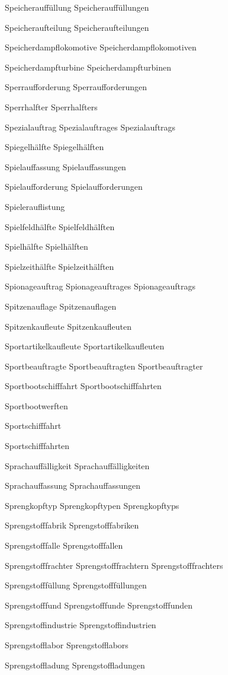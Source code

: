 Speicherauffüllung
Speicherauffüllungen

Speicheraufteilung
Speicheraufteilungen

Speicherdampflokomotive
Speicherdampflokomotiven

Speicherdampfturbine
Speicherdampfturbinen

Sperraufforderung
Sperraufforderungen

Sperrhalfter
Sperrhalfters

Spezialauftrag
Spezialauftrages
Spezialauftrags

Spiegelhälfte
Spiegelhälften

Spielauffassung
Spielauffassungen

Spielaufforderung
Spielaufforderungen

Spielerauflistung

Spielfeldhälfte
Spielfeldhälften

Spielhälfte
Spielhälften

Spielzeithälfte
Spielzeithälften

Spionageauftrag
Spionageauftrages
Spionageauftrags

Spitzenauflage
Spitzenauflagen

Spitzenkaufleute
Spitzenkaufleuten

Sportartikelkaufleute
Sportartikelkaufleuten

Sportbeauftragte
Sportbeauftragten
Sportbeauftragter

Sportbootschifffahrt
Sportbootschifffahrten

Sportbootwerften

Sportschifffahrt

Sportschifffahrten

Sprachauffälligkeit
Sprachauffälligkeiten

Sprachauffassung
Sprachauffassungen

Sprengkopftyp
Sprengkopftypen
Sprengkopftyps

Sprengstofffabrik
Sprengstofffabriken

Sprengstofffalle
Sprengstofffallen

Sprengstofffrachter
Sprengstofffrachtern
Sprengstofffrachters

Sprengstofffüllung
Sprengstofffüllungen

Sprengstofffund
Sprengstofffunde
Sprengstofffunden

Sprengstoffindustrie
Sprengstoffindustrien

Sprengstofflabor
Sprengstofflabors

Sprengstoffladung
Sprengstoffladungen

